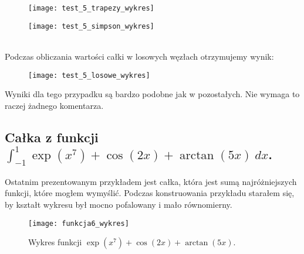 \documentclass{article}
\begin{document}
  \begin{minipage}{\linewidth}
      \centering
      \begin{minipage}{0.35\linewidth}
          \begin{figure}[H]
              \texttt{[image: test\_5\_trapezy\_wykres]}
          \end{figure}
      \end{minipage}
      \hspace{0.05\linewidth}
      \begin{minipage}{0.35\linewidth}
          \begin{figure}[H]
              \texttt{[image: test\_5\_simpson\_wykres]}
          \end{figure}
      \end{minipage}
  \end{minipage}\\

Podczas obliczania wartości całki w losowych węzłach otrzymujemy wynik:

\begin{figure}[h!]
\centering
\texttt{[image: test\_5\_losowe\_wykres]}
\end{figure}

Wyniki dla tego przypadku są bardzo podobne jak w pozostałych. Nie wymaga to raczej żadnego komentarza.

\pagebreak



\subsection{Całka z funkcji $\int_{-1}^{1} \exp(x^7) + \cos(2x)+ \arctan(5x) \ dx$.}


Ostatnim prezentowanym przykładem jest całka, która jest sumą najróżniejszych funkcji, które mogłem wymyślić. Podczas konstruowania przykładu starałem się, by kształt wykresu był mocno pofalowany i mało równomierny.


\begin{figure}[h!]
\centering
\texttt{[image: funkcja6\_wykres]}
\caption{Wykres funkcji $\exp(x^7) + \cos(2x)+ \arctan(5x)$.}	
\end{figure}
\end{document}
